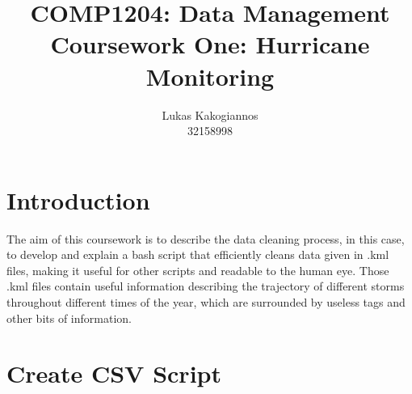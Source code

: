 \documentclass[]{article}
\title{COMP1204: Data Management \\ Coursework One: Hurricane Monitoring }
\author{Lukas Kakogiannos \\ 32158998}
\begin{document}
\maketitle

\section{Introduction}
\par
The aim of this coursework is to describe the data cleaning process, in this case, to develop and explain a bash script that efficiently cleans data given in .kml files, making it useful for other scripts and readable to the human eye. Those .kml files contain useful information describing the trajectory of different storms throughout different times of the year, which are surrounded by useless tags and other bits of information. 
\par
\section{Create CSV Script}
\end{document}
